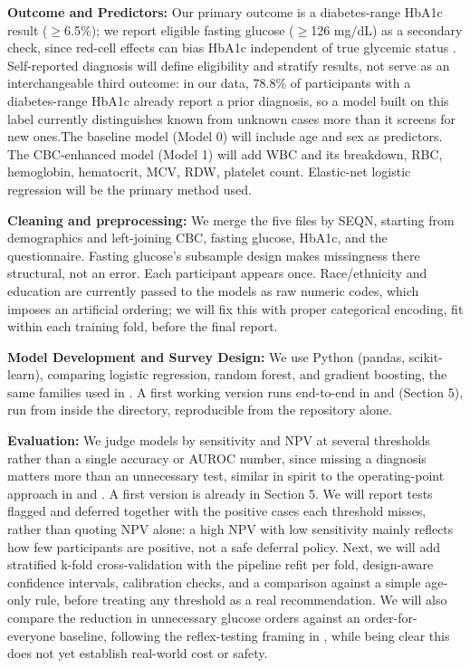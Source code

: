 \documentclass[conference]{IEEEtran}
\begin{document}
\noindent\textbf{Outcome and Predictors:} Our primary outcome is a diabetes-range HbA1c result (\(\geq\)6.5\%); we report eligible fasting glucose (\(\geq\)126 mg/dL) as a secondary check, since red-cell effects can bias HbA1c independent of true glycemic status \cite{english2015}. Self-reported diagnosis will define eligibility and stratify results, not serve as an interchangeable third outcome: in our data, 78.8\% of participants with a diabetes-range HbA1c already report a prior diagnosis, so a model built on this label currently distinguishes known from unknown cases more than it screens for new ones.The baseline model (Model 0) will include age and sex as predictors. The CBC-enhanced model (Model 1) will add WBC and its breakdown, RBC, hemoglobin, hematocrit, MCV, RDW, platelet count. Elastic-net logistic regression will be the primary method used.


\noindent\textbf{Cleaning and preprocessing:} We merge the five files by SEQN, starting from demographics and left-joining CBC, fasting glucose, HbA1c, and the questionnaire. Fasting glucose's subsample design makes missingness there structural, not an error. Each participant appears once. Race/ethnicity and education are currently passed to the models as raw numeric codes, which imposes an artificial ordering; we will fix this with proper categorical encoding, fit within each training fold, before the final report.


\noindent\textbf{Model Development and Survey Design:} We use Python (pandas, scikit-learn), comparing logistic regression, random forest, and gradient boosting, the same families used in \cite{guo2026}. A first working version runs end-to-end in  and  (Section 5), run from inside the  directory, reproducible from the repository alone.


\noindent\textbf{Evaluation:} We judge models by sensitivity and NPV at several thresholds rather than a single accuracy or AUROC number, since missing a diagnosis matters more than an unnecessary test, similar in spirit to the operating-point approach in \cite{kamkar2026} and \cite{liu2025}. A first version is already in Section 5. We will report tests flagged and deferred together with the positive cases each threshold misses, rather than quoting NPV alone: a high NPV with low sensitivity mainly reflects how few participants are positive, not a safe deferral policy. Next, we will add stratified k-fold cross-validation with the pipeline refit per fold, design-aware confidence intervals, calibration checks, and a comparison against a simple age-only rule, before treating any threshold as a real recommendation. We will also compare the reduction in unnecessary glucose orders against an order-for-everyone baseline, following the reflex-testing framing in \cite{mcdermott2023}, while being clear this does not yet establish real-world cost or safety.
\end{document}
